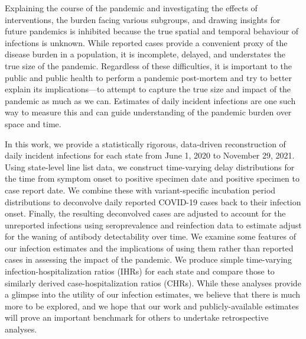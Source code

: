 Explaining the course of the pandemic and investigating the effects of
interventions, the burden facing various subgroups, and drawing insights for
future pandemics is inhibited because the true spatial and temporal behaviour of
infections is unknown. While reported cases provide a convenient proxy of the
disease burden in a population, it is incomplete, delayed, and understates the
true size of the pandemic. Regardless of these difficulties, it is important to
the public and public health to perform a pandemic post-mortem and try to better
explain its implications---to attempt to capture the true size and impact of the
pandemic as much as we can. Estimates of daily incident infections are one such
way to measure this and can guide understanding of the pandemic burden over
space and time.

In this work, we provide a statistically rigorous, data-driven reconstruction of
daily incident infections for each \US state from June 1, 2020 to November 29,
2021. Using state-level line list data, we construct time-varying delay
distributions for the time from symptom onset to positive specimen date and
positive specimen to case report date. We combine these with variant-specific
incubation period distributions to deconvolve daily reported COVID-19 cases back
to their infection onset. Finally, the resulting deconvolved cases are adjusted
to account for the unreported infections using seroprevalence and reinfection
data to estimate adjust for the waning of antibody detectability over time. We
examine some features of our infection estimates and the implications of using
them rather than reported cases in assessing the impact of the pandemic. We
produce simple time-varying infection-hospitalization ratios (IHRs) for each
state and compare those to similarly derived case-hospitalization ratios (CHRs).
While these analyses provide a glimpse into the utility of our infection
estimates, we believe that there is much more to be explored, and we hope that
our work and publicly-available estimates will prove an
important benchmark for others to undertake retrospective analyses.
